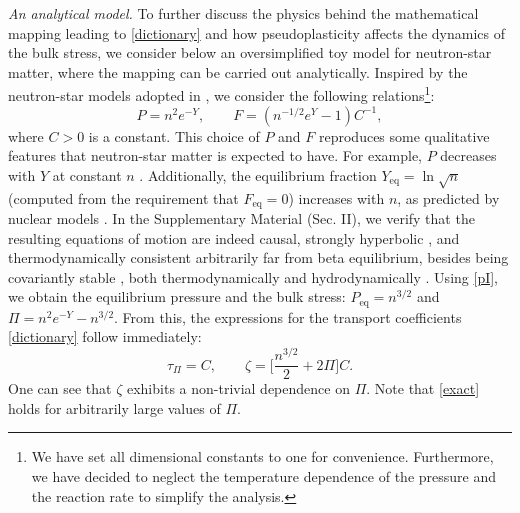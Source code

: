 \documentclass[aps,prl,noshowpacs,noshowkeys,floatfix,superscriptaddress,singlecolum,nofootinbib]{revtex4-2}
\theoremstyle{definition}
\theoremstyle{theorem}
\begin{document}
\noindent \textit{An analytical model.}
To further discuss the physics behind the mathematical mapping leading to \eqref{dictionary} and how pseudoplasticity affects the dynamics of the bulk stress, we consider below an oversimplified toy model for neutron-star matter, where the mapping can be carried out analytically. 
Inspired by the neutron-star models adopted in \cite{Camelio2022,CamelioSimulations2022}, we consider the following relations\footnote{We have set all dimensional constants to one for convenience. Furthermore, we have decided to neglect the temperature dependence of the pressure and the reaction rate to simplify the analysis.}:
\begin{equation}\label{quaccheri}
P=n^2 e^{-Y},\qquad 
F= (n^{-1/2}e^Y-1)C^{-1}, 
\end{equation}
where $C {>} 0$ is a constant. This choice of $P$ and $F$ reproduces some qualitative features that neutron-star matter is expected to have. For example, $P$ decreases with $Y$ at constant $n$ \cite{Yang:2023ogo}. 
Additionally, the equilibrium fraction $Y_{\text{eq}}{=}\ln\sqrt{n}$ (computed from the requirement that $F_{\text{eq}}=0$) increases with $n$, as predicted by nuclear models \cite{CamelioSimulations2022}. In the Supplementary Material (Sec. II), we verify that the resulting equations of motion are indeed causal, strongly hyperbolic \cite{rezzolla_book}, and thermodynamically consistent arbitrarily far from beta equilibrium, besides being covariantly stable \cite{GavassinoSuperluminal2021,GavassinoBounds2023}, both thermodynamically and hydrodynamically \cite{GavassinoGibbs2021,
GavassinoCausality2021,GavassinoStabilityCarter2022}. Using \eqref{pI}, we obtain the equilibrium pressure and the bulk stress: $P_{\text{eq}}= n^{3/2}$ and $\Pi = n^2 e^{-Y}-n^{3/2}$. From this, the expressions for the transport coefficients \eqref{dictionary} follow immediately: 
\begin{equation}\label{exact}
\tau_\Pi = C,\quad \quad
\zeta =\bigg[\dfrac{n^{3/2}}{2} +2\Pi \bigg]C .
\end{equation}
One can see that $\zeta$ exhibits a non-trivial dependence on $\Pi$. Note that \eqref{exact} holds for arbitrarily large values of $\Pi$.\\
\end{document}
